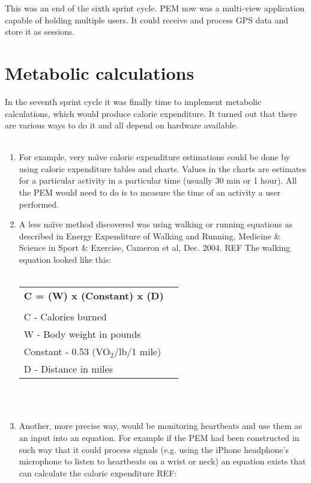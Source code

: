 \documentclass[12pt, a4paper]{report}   %
\begin{document}
\begin{enumerate}
This was an end of the sixth sprint cycle. PEM now was a multi-view application capable of holding multiple users. It could receive and process GPS data and store it as sessions.


\clearpage
\section{Metabolic calculations}
In the seventh sprint cycle it was finally time to implement metabolic calculations, which would produce caloric expenditure. It turned out that there are various ways to do it and all depend on hardware available.\\ \\

\begin{enumerate}
	\item For example, very na\"\i ve caloric expenditure estimations could be done by using caloric expenditure tables and charts. Values in the charts are estimates for a particular activity in a particular time (usually 30 min or 1 hour). All the PEM would need to do is to measure the time of an activity a user performed.\\
	\item A less na\"\i ve method discovered was using walking or running equations as described in Energy Expenditure of Walking and Running, Medicine \& Science in Sport \& Exercise, Cameron et al, Dec. 2004. REF The walking equation looked like this:\\ \\

\begin{tabular}{ll}
\textbf{C = (W) x (Constant) x (D)}\\ \\
C - Calories burned\\
W - Body weight in pounds\\
Constant - 0.53 (VO$_{2}$/lb/1 mile)\\
D - Distance in miles\\
\end{tabular}\\ \\


	\item Another, more precise way, would be monitoring heartbeats and use them as an input into an equation. For example if the PEM had been constructed in such way that it could process signals (e.g. using the iPhone headphone's microphone to listen to heartbeats on a wrist or neck) an equation exists that can calculate the caloric expenditure REF:\\ \\



\end{enumerate}
\end{enumerate}
\end{document}
